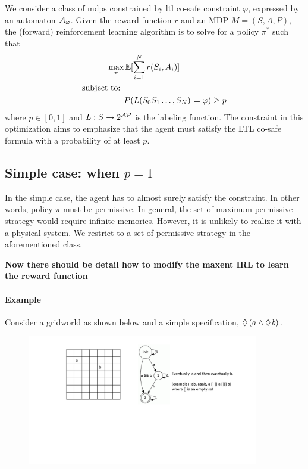 \documentclass{article}[11pt]
\begin{document}
We consider a class of \ac{mdp}s constrained by \ac{ltl} co-safe
constraint $\varphi$, expressed by an automaton $\mathcal{A}_\varphi$. Given
the reward function $r$ and an MDP $M= (S, A, P)$, the (forward)
reinforcement learning algorithm is to solve for a policy $\pi^\ast$ such that 
\begin{align*}
\max_{\pi} & \mathop{\mathbb{E}{}}\nolimits[\sum_{i=1}^N r(S_i, A_i)]\\
\text{subject to: } & \\
& P(L(S_0S_1\ldots, S_N) \models \varphi) \ge p \\
\end{align*}
where $p\in [0,1]$ and $L: S\rightarrow 2^{\cal AP}$ is the labeling
function. The constraint in this optimization aims to emphasize that
the agent must satisfy the LTL co-safe formula with a probability of
at least $p$.  

\subsection{Simple case: when $p=1$}

In the simple case, the agent has to almost surely satisfy the
constraint. In other words, policy $\pi$ must be permissive. In
general, the set of maximum permissive strategy would require infinite
memories. However, it is unlikely to realize it with a physical
system. We restrict to a set of permissive strategy in the
aforementioned class.

\textbf{Now there should be detail how to modify the maxent IRL to learn the reward function}

\paragraph*{Example}
Consider a gridworld as shown below and a simple specification,
$ \Diamond \, (a \land \Diamond \, b)$.

\begin{figure}
\includegraphics[width=0.9\textwidth]{fig/simpleLTL}
\caption{}
\label{fig:simpleltl}
\end{figure}
\end{document}
